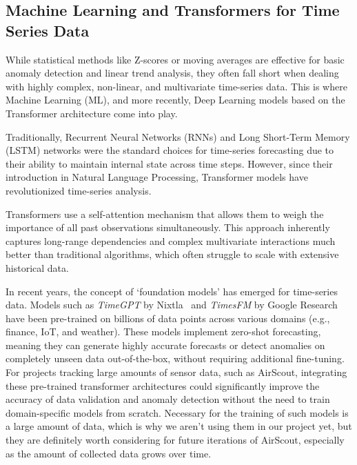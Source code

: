 \subsection{Machine Learning and Transformers for Time Series Data}

While statistical methods like Z-scores or moving averages are effective for
basic anomaly detection and linear trend analysis, they often fall short when
dealing with highly complex, non-linear, and multivariate time-series data.
This is where Machine Learning (ML), and more recently, Deep Learning models
based on the Transformer architecture come into play.\\\cite{AI&ML:23}

Traditionally, Recurrent Neural Networks (RNNs) and Long Short-Term Memory
(LSTM) networks were the standard choices for time-series forecasting due to
their ability to maintain internal state across time steps. However, since
their introduction in Natural Language Processing, Transformer models have
revolutionized time-series analysis.

Transformers use a self-attention mechanism that allows them to weigh the
importance of all past observations simultaneously. This approach inherently
captures long-range dependencies and complex multivariate interactions much
better than traditional algorithms, which often struggle to scale with
extensive historical data.

In recent years, the concept of `foundation models' has emerged for time-series
data. Models such as \textit{TimeGPT} by Nixtla~\cite{TimeGPT:01} and
\textit{TimesFM} by Google Research~\cite{TimesFM:01} have been pre-trained on
billions of data points across various domains (e.g., finance, IoT, and
weather). These models implement zero-shot forecasting, meaning they can
generate highly accurate forecasts or detect anomalies on completely unseen
data out-of-the-box, without requiring additional fine-tuning. For projects
tracking large amounts of sensor data, such as AirScout, integrating these
pre-trained transformer architectures could significantly improve the accuracy of
data validation and anomaly detection without the need to train domain-specific
models from scratch. Necessary for the training of such models is a large
amount of data, which is why we aren't using them in our project yet, but they
are definitely worth considering for future iterations of AirScout, especially
as the amount of collected data grows over time.

